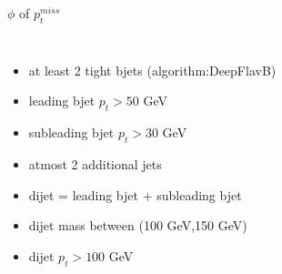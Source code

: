\documentclass[10pt,xcolor=dvipsnames]{beamer}
\begin{document}
\begin{frame}[fragile]{$\phi $ of $p^{miss}_t$ }
\begin{columns}
\begin{itemize}
      \item {at least 2 tight bjets (algorithm:DeepFlavB)}
      \item {leading bjet $p_t > 50 $ GeV}
      \item {subleading bjet $p_t > 30 $ GeV}
      \item {atmost 2 additional jets}
      \item {dijet = leading bjet + subleading bjet}
      \item {dijet mass between (100 GeV,150 GeV)}
      \item {dijet $p_t > 100 $ GeV}
    \end{itemize}
  \end{columns}
\end{frame}






\end{document}
